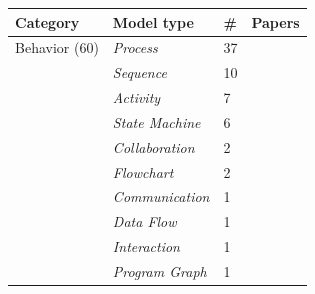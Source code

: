 \begin{tabular} {p{}  p{} p{} p{}} \\ 
\toprule 
Category & Model type & \# & Papers\\ 
\midrule  
Behavior (60) & \emph{Process} & 37 & \cite{ \papereighth,\papereighteenth,\papertwentieth,\papertwentyseventh,\paperthirtieth,\paperthirtythird,\paperthirtyfourth,\paperthirtyninth,\papereightyfirst,\papereightysixth,\papereightyseventh,\paperninetyfirst,\paperninetythird,\paperninetyfourth,\paperninetyfifth,\paperninetysixth,\paperonehundredtwentyeighth,\paperonehundredthirtysixth,\paperonehundredthirtyseventh,\paperonehundredthirtyeighth,\paperonehundredthirtyninth,\paperonehundredfortyfourth,\paperonehundredfiftyfirst,\paperonehundredfiftyeighth,\paperonehundredsixtieth,\paperonehundredsixtyfirst,\paperonehundredsixtysecond,\paperonehundredsixtythird,\paperonehundredsixtyfifth,\paperonehundredninetysecond,\paperonehundredninetythird,\paperonehundredninetyfifth,\papertwohundredtwentyninth,\papertwohundredthirtieth,\papertwohundredthirtythird,\papertwohundredthirtyfourth,\papertwohundredfortysixth }\\ 
 & \emph{Sequence} & 10 & \cite{ \paperseventeenth,\paperfortythird,\papersixtyninth,\paperonehundredfiftieth,\paperonehundredsixtythird,\papertwohundredtwelfth,\papertwohundrednineteenth,\papertwohundredthirtyseventh,\papertwohundredthirtyninth,\papertwohundredfortieth }\\ 
 & \emph{Activity} & 7 & \cite{ \paperfourteenth,\paperfortythird,\paperfortyseventh,\paperseventyfourth,\papereightythird,\paperninetyseventh,\papertwohundredthirtyseventh }\\ 
 & \emph{State Machine} & 6 & \cite{ \papertenth,\paperfifteenth,\paperfortythird,\paperfortyseventh,\paperonehundredseventh,\papertwohundredthirtyeighth }\\ 
 & \emph{Collaboration} & 2 & \cite{ \paperfortythird,\paperonehundredninetyfourth }\\ 
 & \emph{Flowchart} & 2 & \cite{ \papertwohundredfifteenth,\papertwohundredthirtyfifth }\\ 
 & \emph{Communication} & 1 & \cite{ \paperfortythird }\\ 
 & \emph{Data Flow} & 1 & \cite{ \paperonehundredthirtyfirst }\\ 
 & \emph{Interaction} & 1 & \cite{ \paperfortythird }\\ 
 & \emph{Program Graph} & 1 & \cite{ \papertwohundredfifteenth }\\ 

\end{tabular}
